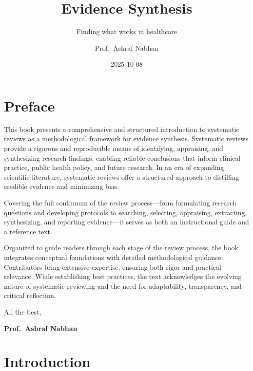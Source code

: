 \documentclass[
  11pt,
  a4paper,
  DIV=11,
  numbers=noendperiod]{scrreprt}
\title{Evidence Synthesis}
\subtitle{Finding what works in healthcare}
\author{Prof.~Ashraf Nabhan}
\date{2025-10-08}
\renewcommand*\contentsname{Table of contents}
\newcommand\contentsname{Table of contents}
\begin{document}
\maketitle

\renewcommand*\contentsname{On this page}
{
\hypersetup{linkcolor=}
\setcounter{tocdepth}{2}
\tableofcontents
}


\chapter*{Preface}\label{preface}


This book presents a comprehensive and structured introduction to
systematic reviews as a methodological framework for evidence synthesis.
Systematic reviews provide a rigorous and reproducible means of
identifying, appraising, and synthesizing research findings, enabling
reliable conclusions that inform clinical practice, public health
policy, and future research. In an era of expanding scientific
literature, systematic reviews offer a structured approach to distilling
credible evidence and minimizing bias.

Covering the full continuum of the review process---from formulating
research questions and developing protocols to searching, selecting,
appraising, extracting, synthesizing, and reporting evidence---it serves
as both an instructional guide and a reference text.

Organized to guide readers through each stage of the review process, the
book integrates conceptual foundations with detailed methodological
guidance. Contributors bring extensive expertise, ensuring both rigor
and practical relevance. While establishing best practices, the text
acknowledges the evolving nature of systematic reviewing and the need
for adaptability, transparency, and critical reflection.

All the best,

\textbf{Prof.~Ashraf Nabhan}


\chapter*{Introduction}\label{introduction}

\end{document}
